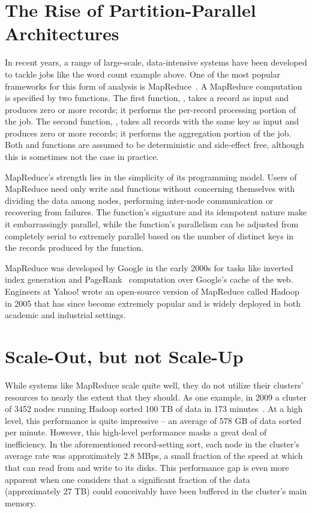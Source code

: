 \section{The Rise of Partition-Parallel Architectures}

In recent years, a range of large-scale, data-intensive systems have been
developed to tackle jobs like the word count example above.  One of the most
popular frameworks for this form of analysis is MapReduce~\cite{mapreduce}. A
MapReduce computation is specified by two functions. The first function, \map,
takes a record as input and produces zero or more records; it performs the
per-record processing portion of the job. The second function, \reduce, takes
all records with the same key as input and produces zero or more records; it
performs the aggregation portion of the job. Both \map and \reduce functions
are assumed to be deterministic and side-effect free, although this
is sometimes not the case in practice.

MapReduce's strength lies in the simplicity of its programming model. Users of
MapReduce need only write \map and \reduce functions without concerning
themselves with dividing the data among nodes, performing inter-node
communication or recovering from failures. The \map function's signature and its
idempotent nature make it embarrassingly parallel, while the \reduce function's
parallelism can be adjusted from completely serial to extremely parallel based
on the number of distinct keys in the records produced by the \map function.

MapReduce was developed by Google in the early 2000s for tasks like inverted
index generation and PageRank~\cite{pagerank} computation over Google's cache
of the web. Engineers at Yahoo! wrote an open-source version of MapReduce
called Hadoop~\cite{hadoop} in 2005 that has since become extremely popular and
is widely deployed in both academic and industrial settings.

\section{Scale-Out, but not Scale-Up}

While systems like MapReduce scale quite well, they do not utilize their
clusters' resources to nearly the extent that they should. As one example, in
2009 a cluster of 3452 nodes running Hadoop sorted 100 TB of data in 173
minutes~\cite{hadoop-sort-2009}. At a high level, this performance is quite
impressive -- an average of 578 GB of data sorted per minute. However, this
high-level performance masks a great deal of inefficiency. In the
aforementioned record-setting sort, each node in the cluster's average rate was
approximately 2.8 MBps, a small fraction of the speed at which that can read
from and write to its disks. This performance gap is even more apparent when
one considers that a significant fraction of the data (approximately 27 TB)
could conceivably have been buffered in the cluster's main memory.

